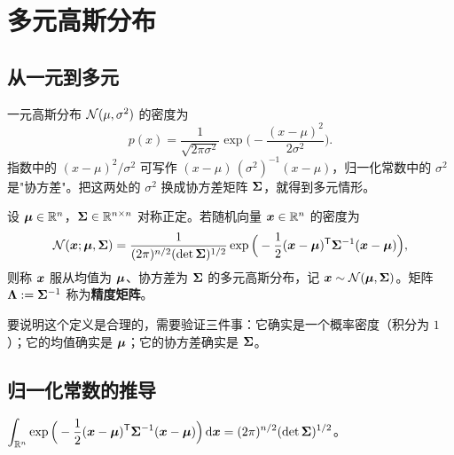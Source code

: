 \section{多元高斯分布}\label{sec:gauss}

\subsection{从一元到多元}

一元高斯分布 $\mathcal{N}(\mu,\sigma^2)$ 的密度为
\[
p(x)=\frac{1}{\sqrt{2\pi\sigma^2}}\exp\Big(-\frac{(x-\mu)^2}{2\sigma^2}\Big).
\]
指数中的 $(x-\mu)^2/\sigma^2$ 可写作 $(x-\mu)\,(\sigma^2)^{-1}(x-\mu)$，归一化常数中的 $\sigma^2$ 是"协方差"。把这两处的 $\sigma^2$ 换成协方差矩阵 $\bm{\Sigma}$，就得到多元情形。

\begin{definition}[多元高斯分布]\label{def:mvn}
设 $\bm{\mu}\in\mathbb{R}^n$，$\bm{\Sigma}\in\mathbb{R}^{n\times n}$ 对称正定。若随机向量 $\bm{x}\in\mathbb{R}^n$ 的密度为
\begin{equation}\label{eq:mvn}
\mathcal{N}(\bm{x};\bm{\mu},\bm{\Sigma})=\frac{1}{(2\pi)^{n/2}(\det\bm{\Sigma})^{1/2}}
\exp\Big(-\frac12(\bm{x}-\bm{\mu})^{\mathsf{T}}\bm{\Sigma}^{-1}(\bm{x}-\bm{\mu})\Big),
\end{equation}
则称 $\bm{x}$ 服从均值为 $\bm{\mu}$、协方差为 $\bm{\Sigma}$ 的多元高斯分布，记 $\bm{x}\sim\mathcal{N}(\bm{\mu},\bm{\Sigma})$。矩阵 $\bm{\Lambda}:=\bm{\Sigma}^{-1}$ 称为\textbf{精度矩阵}。
\end{definition}

要说明这个定义是合理的，需要验证三件事：它确实是一个概率密度（积分为 $1$）；它的均值确实是 $\bm{\mu}$；它的协方差确实是 $\bm{\Sigma}$。

\subsection{归一化常数的推导}

\begin{proposition}\label{prop:normalize}
$\displaystyle\int_{\mathbb{R}^n}\exp\Big(-\frac12(\bm{x}-\bm{\mu})^{\mathsf{T}}\bm{\Sigma}^{-1}(\bm{x}-\bm{\mu})\Big)\,\mathrm{d}\bm{x}=(2\pi)^{n/2}(\det\bm{\Sigma})^{1/2}$。
\end{proposition}

